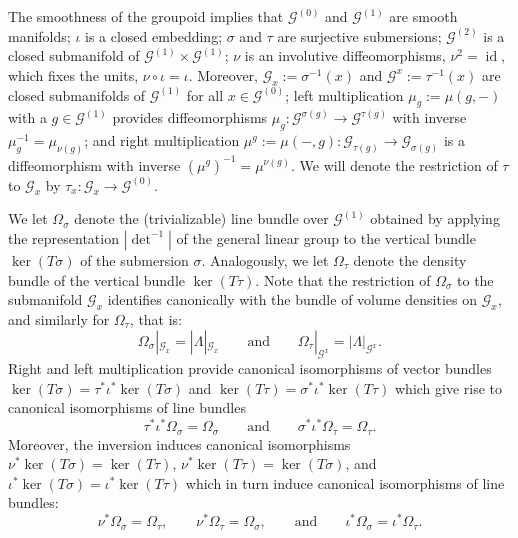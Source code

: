 \documentclass[reqno,12pt]{amsart}
\DeclareMathOperator{\id}{id}
\theoremstyle{plain}
\theoremstyle{definition}
\begin{document}
The smoothness of the groupoid implies that $\mathcal G^{(0)}$ and $\mathcal G^{(1)}$ are smooth manifolds;
$\iota$ is a closed embedding;
$\sigma$ and $\tau$ are surjective submersions;
$\mathcal G^{(2)}$ is a closed submanifold of $\mathcal G^{(1)}\times\mathcal G^{(1)}$;
$\nu$ is an involutive diffeomorphisms, $\nu^2=\id$, which fixes the units, $\nu\circ\iota=\iota$.
Moreover, $\mathcal G_x:=\sigma^{-1}(x)$ and $\mathcal G^x:=\tau^{-1}(x)$ are closed submanifolds of $\mathcal G^{(1)}$ for all $x\in\mathcal G^{(0)}$;
left multiplication $\mu_g:=\mu(g,-)$ with a $g\in\mathcal G^{(1)}$ provides diffeomorphisms $\mu_g\colon\mathcal G^{\sigma(g)}\to\mathcal G^{\tau(g)}$ with inverse $\mu_g^{-1}=\mu_{\nu(g)}$;
and right multiplication $\mu^g:=\mu(-,g)\colon\mathcal G_{\tau(g)}\to\mathcal G_{\sigma(g)}$ is a diffeomorphism with inverse $(\mu^g)^{-1}=\mu^{\nu(g)}$.
We will denote the restriction of $\tau$ to $\mathcal G_x$ by $\tau_x\colon\mathcal G_x\to\mathcal G^{(0)}$.


We let $\Omega_\sigma$ denote the (trivializable) line bundle over $\mathcal G^{(1)}$ obtained by applying the
representation $|\det^{-1}|$ of the general linear group to the vertical bundle $\ker(T\sigma)$ of the submersion $\sigma$.
Analogously, we let $\Omega_\tau$ denote the density bundle of the vertical bundle $\ker(T\tau)$.
Note that the restriction of $\Omega_\sigma$ to the submanifold $\mathcal G_x$ identifies canonically 
with the bundle of volume densities on $\mathcal G_x$, and similarly for $\Omega_\tau$, that is:
\begin{equation}\label{E:Ost}
\Omega_\sigma|_{\mathcal G_x}=|\Lambda|_{\mathcal G_x}
\qquad\text{and}\qquad
\Omega_\tau|_{\mathcal G^x}=|\Lambda|_{\mathcal G^x}.
\end{equation}
Right and left multiplication provide canonical isomorphisms of vector bundles $\ker(T\sigma)=\tau^*\iota^*\ker(T\sigma)$ and $\ker(T\tau)=\sigma^*\iota^*\ker(T\tau)$
which give rise to canonical isomorphisms of line bundles
\begin{equation}\label{E:canalg}
\tau^*\iota^*\Omega_\sigma=\Omega_\sigma
\qquad\text{and}\qquad
\sigma^*\iota^*\Omega_\tau=\Omega_\tau.
\end{equation}
Moreover, the inversion induces canonical isomorphisms $\nu^*\ker(T\sigma)=\ker(T\tau)$, $\nu^*\ker(T\tau)=\ker(T\sigma)$, and $\iota^*\ker(T\sigma)=\iota^*\ker(T\tau)$ 
which in turn induce canonical isomorphisms of line bundles:
\begin{equation}\label{E:nuO}
\nu^*\Omega_\sigma=\Omega_\tau,
\qquad\nu^*\Omega_\tau=\Omega_\sigma,
\qquad\text{and}\qquad
\iota^*\Omega_\sigma=\iota^*\Omega_\tau.
\end{equation}
\end{document}
